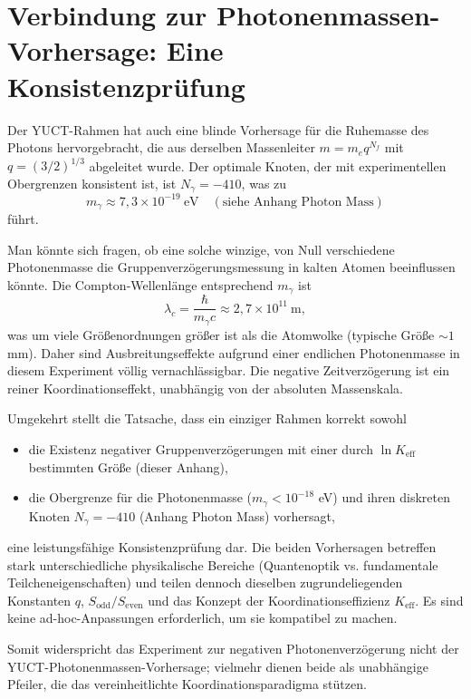 \documentclass[12pt,a4paper]{article}
\newcommand{\Keff}{K_{\mathrm{eff}}}
\begin{document}
	\section{Verbindung zur Photonenmassen-Vorhersage: Eine Konsistenzprüfung}
	\label{sec:photon_mass_consistency}
	
	Der YUCT-Rahmen hat auch eine blinde Vorhersage für die Ruhemasse des Photons hervorgebracht, die aus derselben Massenleiter \(m = m_e q^{N_f}\) mit \(q=(3/2)^{1/3}\) abgeleitet wurde. Der optimale Knoten, der mit experimentellen Obergrenzen konsistent ist, ist \(N_\gamma = -410\), was zu
	\[
	m_\gamma \approx 7,3 \times 10^{-19}~\text{eV} \quad (\text{siehe Anhang Photon Mass})
	\]
	führt.
	
	Man könnte sich fragen, ob eine solche winzige, von Null verschiedene Photonenmasse die Gruppenverzögerungsmessung in kalten Atomen beeinflussen könnte. Die Compton-Wellenlänge entsprechend \(m_\gamma\) ist
	\[
	\lambda_c = \frac{\hbar}{m_\gamma c} \approx 2,7\times10^{11}~\text{m},
	\]
	was um viele Größenordnungen größer ist als die Atomwolke (typische Größe \(\sim 1\) mm). Daher sind Ausbreitungseffekte aufgrund einer endlichen Photonenmasse in diesem Experiment völlig vernachlässigbar. Die negative Zeitverzögerung ist ein reiner Koordinationseffekt, unabhängig von der absoluten Massenskala.
	
	Umgekehrt stellt die Tatsache, dass ein einziger Rahmen korrekt sowohl
	\begin{itemize}
		\item die Existenz negativer Gruppenverzögerungen mit einer durch \(\ln\Keff\) bestimmten Größe (dieser Anhang),
		\item die Obergrenze für die Photonenmasse (\(m_\gamma < 10^{-18}\) eV) und ihren diskreten Knoten \(N_\gamma = -410\) (Anhang Photon Mass) vorhersagt,
	\end{itemize}
	eine leistungsfähige Konsistenzprüfung dar. Die beiden Vorhersagen betreffen stark unterschiedliche physikalische Bereiche (Quantenoptik vs. fundamentale Teilcheneigenschaften) und teilen dennoch dieselben zugrundeliegenden Konstanten \(q\), \(S_{\mathrm{odd}}/S_{\mathrm{even}}\) und das Konzept der Koordinationseffizienz \(\Keff\). Es sind keine ad-hoc-Anpassungen erforderlich, um sie kompatibel zu machen.
	
	Somit widerspricht das Experiment zur negativen Photonenverzögerung nicht der YUCT-Photonenmassen-Vorhersage; vielmehr dienen beide als unabhängige Pfeiler, die das vereinheitlichte Koordinationsparadigma stützen.
	
\end{document}
